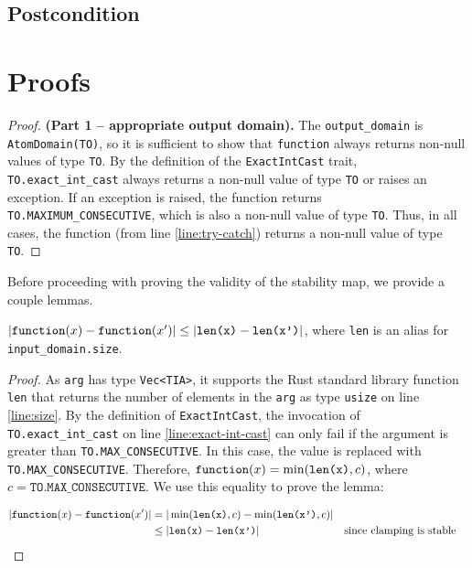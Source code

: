 \documentclass{article}
\begin{document}
\subsection*{Postcondition} 
 
\section{Proofs} 
 
\begin{proof} \textbf{(Part 1 -- appropriate output domain).} 
    The \texttt{output\_domain} is \texttt{AtomDomain(TO)}, so it is sufficient to show that \texttt{function} always returns non-null values of type \texttt{TO}. 
    By the definition of the \texttt{ExactIntCast} trait, \texttt{TO.exact\_int\_cast} always returns a non-null value of type \texttt{TO} or raises an exception. 
    If an exception is raised, the function returns \texttt{TO.MAXIMUM\_CONSECUTIVE}, which is also a non-null value of type \texttt{TO}. 
    Thus, in all cases, the function (from line \ref{line:try-catch}) returns a non-null value of type \texttt{TO}. 
\end{proof} 
 
Before proceeding with proving the validity of the stability map, we provide a couple lemmas. 
 
\begin{lemma} 
    \label{dsym-sens} 
    $|\texttt{function}(x) - \texttt{function}(x')| \leq |\texttt{len(x)} - \texttt{len(x')}|$,  
    where \texttt{len} is an alias for \\ \texttt{input\_domain.size}. 
\end{lemma} 
 
\begin{proof} 
    As \texttt{arg} has type \texttt{Vec<TIA>}, it supports the Rust standard library function \texttt{len}
    that returns the number of elements in the \texttt{arg} as type \texttt{usize} on line \ref{line:size}.
    By the definition of \texttt{ExactIntCast},  
    the invocation of \texttt{TO.exact\_int\_cast} on line \ref{line:exact-int-cast} can only fail if the argument is greater than \texttt{TO.MAX\_CONSECUTIVE}. 
    In this case, the value is replaced with \texttt{TO.MAX\_CONSECUTIVE}. 
    Therefore, $\texttt{function}(x) = \min(\texttt{len(x)}, c)$, where $c = \texttt{TO.MAX\_CONSECUTIVE}$. 
    We use this equality to prove the lemma: 
 
    \begin{align*} 
        |\texttt{function}(x) - \texttt{function}(x')| &= |\min(\texttt{len(x)}, c) - \min(\texttt{len(x')}, c)| \\ 
        &\leq |\texttt{len(x)} - \texttt{len(x')}| &&\text{since clamping is stable} \\ 
    \end{align*} 
\end{proof} 
 
\end{document}
